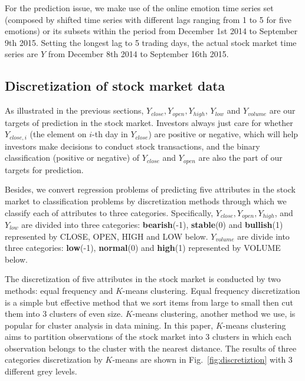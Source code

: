 \documentclass[aps,preprint,groupedaddress]{revtex4-1}
\begin{document}
For the prediction issue, we make use of the online emotion time series set (composed by shifted time series with different lags ranging from 1 to 5 for five emotions) or its subsets within the period from December 1st 2014 to September 9th 2015. Setting the longest lag to 5 trading days, the actual stock market time series are $Y$ from December 8th 2014 to September 16th 2015.

\subsection{Discretization of stock market data}
As illustrated in the previous sections, $Y_{close}, Y_{open}, Y_{high}$, $Y_{low}$ and $Y_{volume}$ are our targets of prediction in the stock market. Investors always just care for whether $Y_{close,i}$ (the element on $i$-th day in $Y_{close}$) are positive or negative, which will help investors make decisions to conduct stock transactions, and the binary classification (positive or negative) of $Y_{close}$ and $Y_{open}$ are also the part of our targets for prediction.

Besides, we convert regression problems of predicting five attributes in the stock market to classification problems by discretization methods through which we classify each of attributes to three categories. Specifically, $Y_{close}, Y_{open}, Y_{high}$, and $Y_{low}$ are divided into three categories: \textbf{bearish}(-1), \textbf{stable}(0) and \textbf{bullish}(1) represented by CLOSE, OPEN, HIGH and LOW below. $Y_{volume}$ are divide into three categories: \textbf{low}(-1), \textbf{normal}(0) and \textbf{high}(1) represented by VOLUME below.

The discretization of five attributes in the stock market is conducted by two methods: equal frequency and $K$-means clustering. Equal frequency discretization is a simple but effective method that we sort items from large to small then cut them into 3 clusters of even size. $K$-means clustering, another method we use, is popular for cluster analysis in data mining. In this paper, $K$-means clustering aims to partition observations of the stock market into 3 clusters in which each observation belongs to the cluster with the nearest distance. The results of three categories discretization by $K$-means are shown in Fig.~\ref{fig:discretiztion} with 3 different grey levels.

\begin{figure*}[!t]
\centering
{}
\hfil
{}
\hfil
{}
\hfil
{}
\hfil
{}
\caption{Stock market time series and discretization results (by $K$-means) of $Y_{close}, Y_{open}, Y_{high}$, $Y_{low}$ and $Y_{volume}$.}
\label{fig:discretiztion}
\end{figure*}
\end{document}
